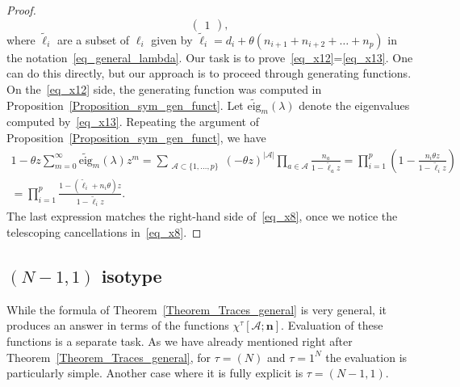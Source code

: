 \documentclass[11pt]{article}
\theoremstyle{definition}
\numberwithin{equation}{section}
\begin{document}
\begin{proof}
\begin{equation}
\begin{pmatrix}
1
\end{pmatrix},
\end{equation}
where $\tilde \ell_i$ are a subset of $\ell_i$ given by $\tilde \ell_i= d_i + \theta (n_{i+1}+n_{i+2}+\dots+n_p)$
in the notation~\eqref{eq_general_lambda}. Our task is to prove~\eqref{eq_x12}=\eqref{eq_x13}. One can do this directly, but our approach is to proceed
through generating functions. On the~\eqref{eq_x12} side, the generating function was computed in Proposition~\ref{Proposition_sym_gen_funct}. Let $\widetilde{\mathrm{eig}}_m(\lambda)$ denote the eigenvalues computed by~\eqref{eq_x13}. Repeating the argument of Proposition~\ref{Proposition_sym_gen_funct}, we have
\begin{multline*}
 1-\theta z \sum_{m=0}^{\infty}  \widetilde{\mathrm{eig}}_m(\lambda) z^m =
  \sum_{\begin{smallmatrix} \mathcal A\subset \{1,\dots,p\} \end{smallmatrix}}  (-\theta z)^{|\mathcal A|}
   \prod_{a\in \mathcal A} \frac{n_a}{1-\tilde \ell_{a}z}=\prod_{i=1}^p\left(1-\frac{n_i \theta z}{1-\tilde \ell_i z}\right)\\=\prod_{i=1}^p\frac{1-(\tilde \ell_i+n_i \theta) z}{1-\tilde \ell_i z}.
\end{multline*}
The last expression matches the right-hand side of~\eqref{eq_x8}, once we notice the telescoping cancellations in~\eqref{eq_x8}.
\end{proof}

\subsection{\texorpdfstring{$(N-1,1)$}{(N-1,1)} isotype}

While the formula of Theorem~\ref{Theorem_Traces_general} is very general, it produces an answer in terms of the functions $\chi^\tau[\mathcal A; \mathbf n]$. Evaluation of these functions is a separate task. As we have already mentioned right after Theorem~\ref{Theorem_Traces_general}, for $\tau=(N)$ and $\tau=1^N$ the evaluation is particularly simple. Another case where it is fully explicit is $\tau=(N-1,1)$.
\end{document}
